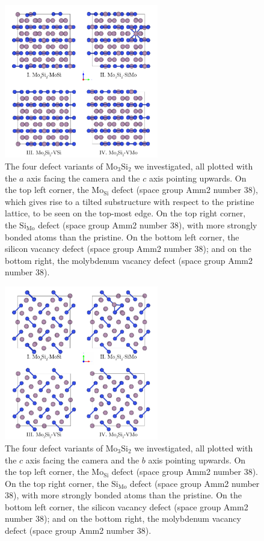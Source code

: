 \documentclass[7.5pt]{article}
\theoremstyle{plain}
\theoremstyle{definition}
\newcommand{\<}{\langle}
\renewcommand{\>}{\rangle}
\begin{document}
\begin{figure}[b!]
\label{fig:mo3si2-defects-a}
\centering
\includegraphics[width=0.6\textwidth]{img/Mo3Si2-defects-a}
\caption{The four defect variants of $\text{Mo}_3\text{Si}_2$ we investigated, all plotted with the $a$ axis facing the camera and the $c$ axis pointing upwards. On the top left corner, the $\text{Mo}_{\text{Si}}$ defect (space group Amm2 number 38), which gives rise to a tilted substructure with respect to the pristine lattice, to be seen on the top-most edge. On the top right corner, the $\text{Si}_{\text{Mo}}$ defect (space group Amm2 number 38), with more strongly bonded atoms than the pristine. On the bottom left corner, the silicon vacancy defect (space group Amm2 number 38); and on the bottom right, the molybdenum vacancy defect (space group Amm2 number 38).}
\end{figure}

\begin{figure}[b!]
\label{fig:mo3si2-defects-c}
\centering
\includegraphics[width=0.6\textwidth]{img/Mo3Si2-defects-c}
\caption{The four defect variants of $\text{Mo}_3\text{Si}_2$ we investigated, all plotted with the $c$ axis facing the camera and the $b$ axis pointing upwards. On the top left corner, the $\text{Mo}_{\text{Si}}$ defect (space group Amm2 number 38). On the top right corner, the $\text{Si}_{\text{Mo}}$ defect (space group Amm2 number 38), with more strongly bonded atoms than the pristine. On the bottom left corner, the silicon vacancy defect (space group Amm2 number 38); and on the bottom right, the molybdenum vacancy defect (space group Amm2 number 38).}
\end{figure}
\end{document}
